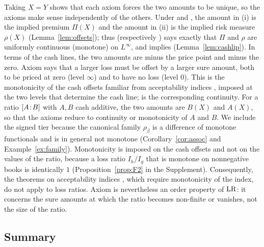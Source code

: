 Taking $X=Y$ shows that each axiom forces the two amounts to be unique, so the axioms make sense independently of
the others. Under \axPe{} and \axR, the amount in (i) is the implied premium $\Pi(X)$ and the amount in (ii) is the
implied risk measure $\rho(X)$ (Lemma~\ref{lem:offsets}); thus \axRC{} (respectively \axRM) says exactly that $\Pi$ and $\rho$
are uniformly continuous (monotone) on $L^\infty$, and \axRM{} implies \axRC{} (Lemma~\ref{lem:cashlip}). In
terms of the cash lines, the two amounts are minus the price point and minus the zero. Axiom \axRM{} says that a
larger loss must be offset by a larger sure amount, both to be priced at zero (level $\infty$) and to have no loss
(level $0$). This is the monotonicity of the cash offsets familiar from acceptability indices
\citep{chernymadan2009}, imposed at the two levels that determine the cash line; \axRC{} is the corresponding
continuity. For a ratio $[A\!:\!B]$ with $A,B$ cash additive, the two amounts are $B(X)$ and $A(X)$, so that
the axioms reduce to continuity or monotonicity of $A$ and $B$. We include the signed tier \axRC{} because the
canonical family $\rho_\beta$ is a difference of monotone functionals and is in general not monotone
(Corollary~\ref{cor:assoc} and Example~\ref{ex:family}). Monotonicity is imposed on the cash offsets and not on the
values of the ratio, because a loss ratio $I_h/I_g$ that is monotone on nonnegative books is identically $1$
(Proposition~\ref{prop:F2} in the Supplement). Consequently, the theorems on acceptability indices
\citep{chernymadan2009}, which require monotonicity of the index, do not apply to loss ratios. Axiom \axRM{} is
nevertheless an order property of $\mathrm{LR}$: it concerns the
sure amounts at which the ratio becomes non-finite or vanishes, not the size of the ratio.

\subsection{Summary}

